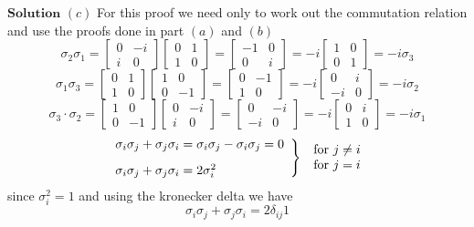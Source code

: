 \documentclass{article}
\begin{document}
\begin{flushleft}
$\boxed{\textbf{Solution}}$  $(c)$ For this proof we need only to work out the commutation relation and use the proofs done in part $(a)$ and $(b)$
$$\sigma_{2} \sigma_{1}=\begin{bmatrix}{0} & {-i} \\ {i} & {0}\end{bmatrix}\begin{bmatrix}{0} & {1} \\ {1} & {0}\end{bmatrix}=\begin{bmatrix}{-1} & {0} \\ {0} & {i}\end{bmatrix}=-i\begin{bmatrix}{1} & {0} \\ {0} & {1}\end{bmatrix} = -i\sigma_3$$
$$\sigma_{1} \sigma_{3}=\begin{bmatrix}{0} & {1} \\ {1} & {0}\end{bmatrix}\begin{bmatrix}{1} & {0} \\ {0} & {-1}\end{bmatrix}=\begin{bmatrix}{0} & {-1} \\ {1} & {0}\end{bmatrix}=-i\begin{bmatrix}{0} & {i} \\ {-i} & {0}\end{bmatrix}=-i \sigma_{2}$$
$$\sigma_{3} \cdot \sigma_{2}=\begin{bmatrix}{1} & {0} \\ {0} & {-1}\end{bmatrix}\begin{bmatrix}{0} & {-i} \\ {i} & {0}\end{bmatrix}=\begin{bmatrix}{0} & {-i} \\ {-i} & {0}\end{bmatrix}=-i\begin{bmatrix}{0} & {i} \\ {1} & {0}\end{bmatrix} = -i\sigma_1$$
$$\left.\begin{array}{l}{\sigma_{i} \sigma_{j}+\sigma_{j} \sigma_{i}=\sigma_{i} \sigma_{j}-\sigma_{i} \sigma_{j}=0} \vspace{3mm} \\ {\sigma_{i} \sigma_{j}+\sigma_{j} \sigma_{i}=2 \sigma_{i}^{2}}\end{array}\right\} \begin{array}{l}{\text { for } j \neq i} \\ {\text { for } j=i}\end{array}$$
since $\sigma_{i}^{2}=1$ and using the kronecker delta we have
$$\sigma_{i} \sigma_{j}+\sigma_{j} \sigma_{i}=2 \delta_{i j} 1$$




\end{flushleft}
\end{document}

